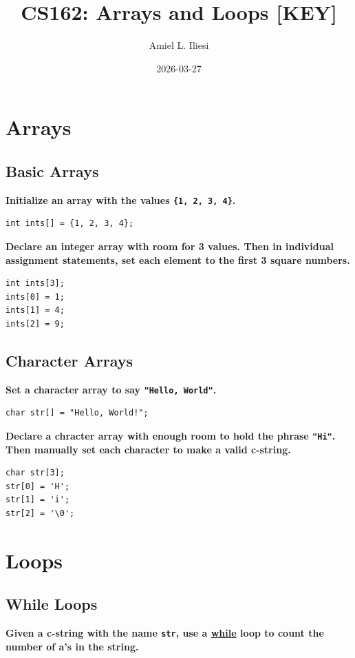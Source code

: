 \documentclass[12pt, letterpaper]{article}
\title{CS162: Arrays and Loops \color{red}\textbf{[KEY]}}
\author{Amiel L. Iliesi}
\date{2026-03-27}
\newcommand{\question}[1]{\textbf{#1}\par}
\begin{document}
\maketitle

\tableofcontents

\pagebreak
\section{Arrays}

\subsection{Basic Arrays}
\question{Initialize an array with the values \texttt{\{1, 2, 3, 4\}}.}

\begin{verbatim}
int ints[] = {1, 2, 3, 4};
\end{verbatim}

\question{Declare an integer array with room for 3 values. Then in individual
assignment statements, set each element to the first 3 square numbers.}

\begin{verbatim}
int ints[3];
ints[0] = 1;
ints[1] = 4;
ints[2] = 9;
\end{verbatim}

\subsection{Character Arrays}

\question{Set a character array to say \texttt{"Hello, World"}.}

\begin{verbatim}
char str[] = "Hello, World!";
\end{verbatim}

\question{Declare a chracter array with enough room to hold the phrase
\texttt{"Hi"}. Then manually set each character to make a valid c-string.}

\begin{verbatim}
char str[3];
str[0] = 'H';
str[1] = 'i';
str[2] = '\0';
\end{verbatim}

\pagebreak
\section{Loops}

\subsection{While Loops}
\question{Given a c-string with the name \texttt{str}, use a \uline{while} loop
to count the number of a's in the string.}
\end{document}
